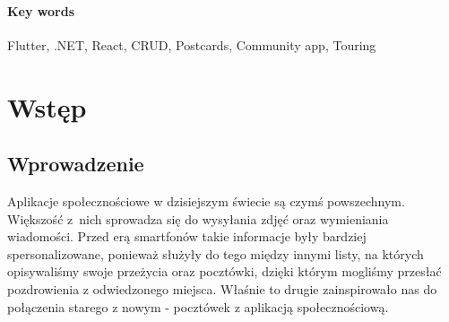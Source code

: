 \documentclass[a4paper,twoside,12pt]{book}
\newcounter{stronyPozaNumeracja}
\begin{document}
\subsubsection*{Key words}  
\begin{otherlanguage}{british}
Flutter, .NET, React, CRUD, Postcards, Community app, Touring
\end{otherlanguage}




\tableofcontents

\setcounter{stronyPozaNumeracja}{\value{page}}
\mainmatter
\pagestyle{empty}

\cleardoublepage

\pagestyle{NumeryStronNazwyRozdzialow}


\chapter{Wstęp}
\label{ch:wstep}

\section{Wprowadzenie}

Aplikacje społecznościowe w dzisiejszym świecie są czymś powszechnym. Większość z~nich sprowadza się do wysyłania zdjęć oraz wymieniania wiadomości. Przed erą smartfonów takie informacje były bardziej spersonalizowane, ponieważ służyły do tego między innymi listy, na których opisywaliśmy swoje przeżycia oraz pocztówki, dzięki którym mogliśmy przesłać pozdrowienia z odwiedzonego miejsca. Właśnie to drugie zainspirowało nas do połączenia starego z nowym - pocztówek z aplikacją społecznościową.
\end{document}
